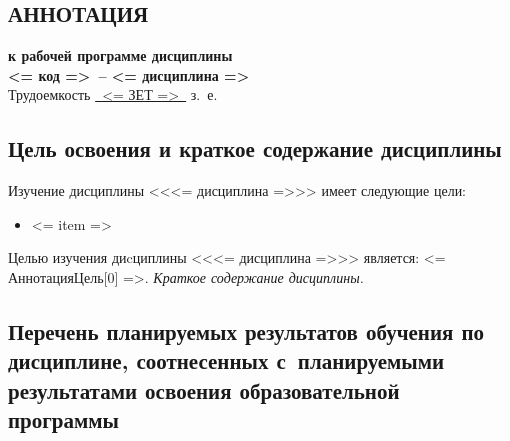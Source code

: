 \documentclass[a4paper,12pt]{article}
\begin{document}
\begin{center}
\section{АННОТАЦИЯ}
  {\bf к рабочей программе дисциплины\\
  <= код =>\ -- <= дисциплина =>} \\
  Трудоемкость \uline{~<= ЗЕТ =>~} з.~е.
\end{center}


\subsection{Цель освоения и краткое содержание дисциплины}
  Изучение дисциплины <<<= дисциплина =>>> имеет следующие цели:
  \begin{itemize}%
    \item <= item => %
  \end{itemize}
  Целью изучения диcциплины <<<= дисциплина =>>> является: <= АннотацияЦель[0] =>.
  \textit{Краткое содержание дисциплины.} %
  



\subsection{Перечень планируемых результатов обучения по дисциплине, соотнесенных с~планируемыми результатами освоения образовательной программы}
\end{document}
